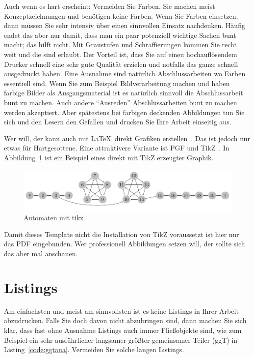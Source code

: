 \documentclass[11pt,a4paper]{report}
\begin{document}
Auch wenn es hart erscheint: Vermeiden Sie Farben. 
Sie machen meist Konzeptzeichnungen und benötigen keine Farben. 
Wenn Sie Farben einsetzen, dann müssen Sie sehr intensiv
über einen sinnvollen Einsatz nachdenken. 
Häufig endet das aber nur damit, dass man ein paar potenziell wichtige Sachen
bunt macht; das hilft nicht. 
Mit Graustufen und Schraffierungen kommen Sie recht weit und
die sind erlaubt. 
Der Vorteil ist, dass Sie auf einen hochauflösendem Drucker
schnell eine sehr gute Qualität erzielen und notfalls das 
ganze schnell ausgedruckt haben. 
Eine Ausnahme sind natürlich Abschlussarbeiten wo Farben 
essentiell sind. 
Wenn Sie zum Beispiel Bildverarbeitung machen und haben 
farbige Bilder als Ausgangsmaterial ist es natürlich sinnvoll
die Abschlussarbeit bunt zu machen. 
Auch andere "`Ausreden"' Abschlussarbeiten bunt zu machen 
werden akzeptiert.
Aber spätestens bei farbigen deckenden Abbildungen tun Sie sich 
und den Lesern den Gefallen und drucken Sie Ihre Arbeit einseitig aus.

Wer will, der kann auch mit \LaTeX\ direkt Grafiken 
erstellen~\cite{kopka}.
Das ist jedoch nur etwas für Hartgesottene.
Eine attraktivere Variante ist PGF und TikZ~\cite{tikz}.
In Abbildung~\ref{fig:tikz} ist ein Beispiel eines direkt mit 
TikZ erzeugter Graphik. 

\begin{figure}[htb]
\centering
\includegraphics[width=.9\textwidth]{automata} %
\caption{Automaten mit tikz~\cite{tikzautomata}}
\label{fig:tikz}
\end{figure}

Damit dieses Template nicht die Installation von TikZ voraussetzt
ist hier nur das PDF eingebunden. 
Wer professionell Abbildungen setzen will, der sollte sich das aber
mal anschauen.


\section{Listings} \label{sec:listings}

Am einfachsten und meist am sinnvollsten ist es keine
Listings in Ihrer Arbeit abzudrucken. 
Falls Sie doch davon nicht abzubringen sind, dann 
machen Sie sich klar, dass fast ohne Ausnahme Listings
auch immer Fließobjekte sind, wie zum Beispiel ein
sehr ausführlicher langsamer größter gemeinsamer Teiler (ggT) 
in Listing~\ref{code:ggtaua}.
Vermeiden Sie solche langen Listings.
\end{document}
